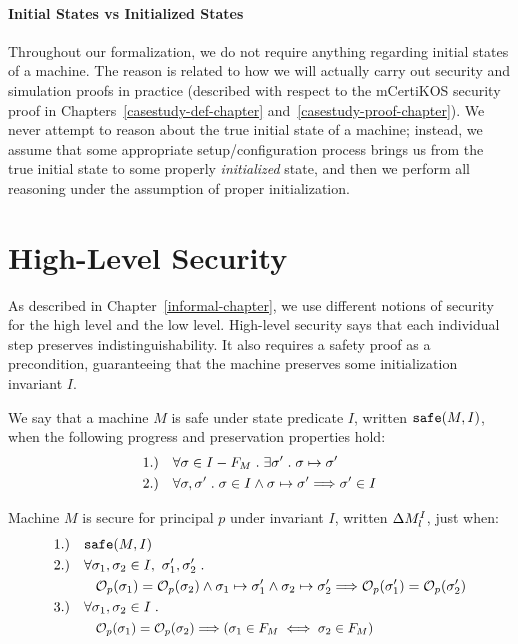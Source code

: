 \paragraph{Initial States vs Initialized States}
Throughout our formalization, we do not require anything regarding 
initial states of a machine. The reason is related to
how we will actually carry out security and simulation proofs in 
practice (described with respect to the mCertiKOS security proof in
Chapters~\ref{casestudy-def-chapter} and~\ref{casestudy-proof-chapter}). We never 
attempt to reason about the true initial state of a machine; instead,
we assume that some appropriate setup/configuration process brings us from
the true initial state to some properly \emph{initialized} state,
and then we perform all reasoning under the assumption of
proper initialization.

\section{High-Level Security}
\label{methodology-security}
As described in Chapter~\ref{informal-chapter}, we use different notions of
security for the high level and the low level. High-level security says
that each individual step preserves indistinguishability. It also
requires a safety proof as a precondition, guaranteeing that 
the machine preserves some initialization invariant $I$.

\begin{definition}[Safety]
We say that a machine $M$ is safe under state predicate $I$, 
written $\text{\tt{safe}}(M,I)$, when the following progress and
preservation properties hold:
{\small\begin{align*}
& 1.) \quad \forall \sigma \in I - F_M \hspace{1mm} . \hspace{1mm}
\exists \sigma' \hspace{1mm} . \hspace{1mm} \sigma \mapsto \sigma' \\
& 2.) \quad \forall \sigma, \sigma' \hspace{1mm} . \hspace{1mm}
\sigma \in I \land
\sigma \mapsto \sigma' \Longrightarrow \sigma' \in I
\end{align*}}
\end{definition}

\begin{definition}
\label{high-level-security}
Machine $M$ is secure for principal $p$ under invariant $I$,
written $\Delta M^{I}_{l}$, just when:
\begin{align*}
& 1.) \quad \safe{M}{I} \\
& 2.) \quad \forall \sigma_1, \sigma_2 \in I, \,\, \sigma_1', \sigma_2' \such \\
& \qquad \quad 
\observe{p}{\sigma_1} = \observe{p}{\sigma_2} \land 
\sigma_1 \steprel \sigma_1' \land \sigma_2 \steprel \sigma_2' 
\Longrightarrow \observe{p}{\sigma_1'} = \observe{p}{\sigma_2'} \\
& 3.) \quad \forall \sigma_1, \sigma_2 \in I \such \\
& \qquad \quad \Scale[0.95]{\observe{p}{\sigma_1} = \observe{p}{\sigma_2} 
\Longrightarrow (\sigma_1 \in F_M \iff \sigma_2 \in F_M)}
\end{align*}
\end{definition}

